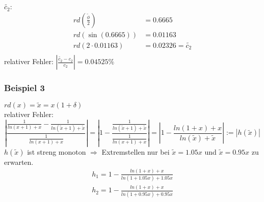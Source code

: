 $ \tilde{c_2}: $ 
\begin{align*}
  rd\left(\frac{\tilde{\phi}}{2}\right) &= 0.6665 \\
  rd(\sin(0.6665)) &= 0.01163 \\
  rd(2 \cdot 0.01163) &= 0.02326 = \tilde{c_2} \\
\end{align*}
relativer Fehler: $ | \frac{\tilde{c_2} - c_2}{c_2} | = 0.04525\% $ \\

\subsubsection{Beispiel 3}
$ rd(x) = \tilde{x} = x(1 + \delta) $ \\
relativer Fehler: \\
\begin{equation*}
\left| \frac{\frac{1}{ln(x + 1) + x} - \frac{1}{ln(\tilde{x} + 1) + \tilde{x}} }{\frac{1}{ln(x + 1) + x}} \right| =
\left| 1 - \frac{\frac{1}{ln(\tilde{x} + 1) + \tilde{x}} }{\frac{1}{ln(x + 1) + x}} \right| =
\left| 1 - \frac{ln(1 + x) +x}{ln(\tilde{x}) + \tilde{x}} \right| := | h(\tilde{x}) |
\end{equation*}
$ h(\tilde{x}) $ ist streng monoton $ \Rightarrow $ Extremstellen nur bei 
$ \tilde{x} = 1.05x $ und $ \tilde{x} = 0.95x $ zu erwarten. \\
\begin{equation*}
\begin{split}
  h_1 = 1 - \frac{ln(1 + x) + x}{ln(1 + 1.05x) + 1.05x} \\
  h_2 = 1 - \frac{ln(1 + x) + x}{ln(1 + 0.95x) + 0.95x}
\end{split}
\end{equation*}

